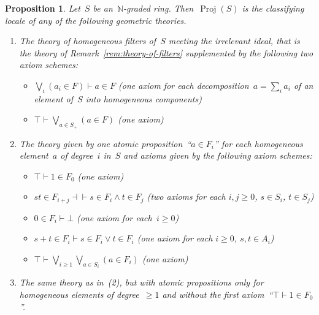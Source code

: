 \documentclass[10pt,reqno,a4paper]{amsbook}
\theoremstyle{definition}
\theoremstyle{plain}
\newtheorem{prop}[defn]{Proposition}
\theoremstyle{remark}
\newcommand{\NN}{\mathbb{N}}
\DeclareMathOperator{\Proj}{Proj}
\newcommand{\?}{\,{:}\,}
\renewcommand{\_}{\mathpunct{.}\,}
\begin{document}
\begin{prop}\label{prop:proj-classifying-locale}
Let~$S$ be an~$\NN$-graded ring. Then~$\Proj(S)$ is the classifying
locale of any of the following geometric theories.
\begin{enumerate}
\item The theory of homogeneous filters of~$S$ meeting the irrelevant ideal,
that is the theory of Remark~\ref{rem:theory-of-filters} supplemented by the
following two axiom schemes:
\begin{itemize}
\item $\bigvee_i (a_i \in F) \vdash a \in F$ (one axiom for each
decomposition~$a = \sum_i a_i$ of an element of~$S$ into homogeneous components)
\item $\top \vdash \bigvee_{a \in S_+} (a \in F)$ (one axiom)
\end{itemize}
\item The theory given by one atomic proposition~``$a \in F_i$'' for each
homogeneous element~$a$ of degree~$i$ in~$S$ and axioms given by the following
axiom schemes:
\begin{itemize}
\item $\top \vdash 1 \in F_0$ (one axiom)
\item $st \in F_{i+j} \dashv\vdash s \in F_i \wedge t \in F_j$ (two axioms for
each $i, j \geq 0$, $s \in S_i$, $t \in S_j$)
\item $0 \in F_i \vdash \bot$ (one axiom for each~$i \geq 0$)
\item $s+t \in F_i \vdash s \in F_i \vee t \in F_i$ (one axiom for each $i \geq
0$, $s,t \in A_i$)
\item $\top \vdash \bigvee_{i \geq 1} \bigvee_{a \in S_i} (a \in F_i)$ (one
axiom)
\end{itemize}
\item The same theory as in~(2), but with atomic propositions only for
homogeneous elements of degree~$\geq 1$ and without the first axiom~``$\top
\vdash 1 \in F_0$''.
\end{enumerate}
\end{prop}
\end{document}
